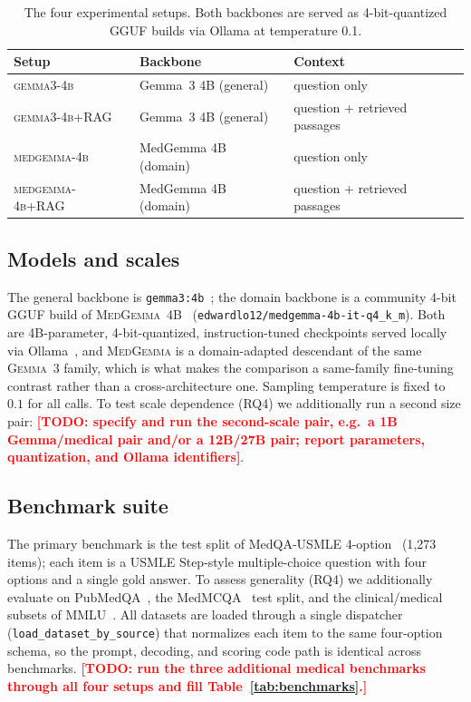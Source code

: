 \documentclass[11pt,a4paper]{article}
\newcommand{\TODO}[1]{\textcolor{red}{\textbf{[TODO: #1]}}}
\begin{document}
\begin{table}[h]
\centering
\small
\begin{tabular}{lll}
\toprule
\textbf{Setup} & \textbf{Backbone} & \textbf{Context} \\
\midrule
\textsc{gemma3-4b} & Gemma~3 4B (general) & question only \\
\textsc{gemma3-4b+RAG} & Gemma~3 4B (general) & question + retrieved passages \\
\textsc{medgemma-4b} & MedGemma 4B (domain) & question only \\
\textsc{medgemma-4b+RAG} & MedGemma 4B (domain) & question + retrieved passages \\
\bottomrule
\end{tabular}
\caption{The four experimental setups. Both backbones are served as
4-bit-quantized GGUF builds via Ollama at temperature 0.1.}
\label{tab:setups}
\end{table}

\subsection{Models and scales}

The general backbone is \texttt{gemma3:4b}~\cite{team2024gemma}; the domain
backbone is a community 4-bit GGUF build of
\textsc{MedGemma}~4B~\cite{sellergren2025medgemma}
(\texttt{edwardlo12/medgemma-4b-it-q4\_k\_m}). Both are 4B-parameter,
4-bit-quantized, instruction-tuned checkpoints served locally via
Ollama~\cite{ollama2024}, and \textsc{MedGemma} is a domain-adapted descendant of
the same \textsc{Gemma~3} family, which is what makes the comparison a
same-family fine-tuning contrast rather than a cross-architecture one. Sampling
temperature is fixed to $0.1$ for all calls. To test scale dependence (RQ4) we
additionally run a second size pair: \TODO{specify and run the second-scale pair,
e.g.\ a 1B Gemma/medical pair and/or a 12B/27B pair; report parameters,
quantization, and Ollama identifiers}.

\subsection{Benchmark suite}

The primary benchmark is the test split of MedQA-USMLE
4-option~\cite{jin2021medqa} (1{,}273 items); each item is a USMLE Step-style
multiple-choice question with four options and a single gold answer. To assess
generality (RQ4) we additionally evaluate on PubMedQA~\cite{jin2019pubmedqa},
the MedMCQA~\cite{pal2022medmcqa} test split, and the clinical/medical subsets of
MMLU~\cite{hendrycks2021mmlu}. All datasets are loaded through a single
dispatcher (\texttt{load\_dataset\_by\_source}) that normalizes each item to the
same four-option schema, so the prompt, decoding, and scoring code path is
identical across benchmarks. \TODO{run the three additional medical benchmarks
through all four setups and fill Table~\ref{tab:benchmarks}.}
\end{document}
